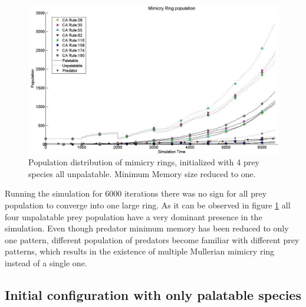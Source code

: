 \documentclass[letterpaper]{article}
\numberwithin{equation}{section}
\begin{document}
\begin{figure}[H]
	\centering
	\includegraphics[scale=0.45]{../tex/images/simTime6k-4Prey-unp-1-mem}
	\caption[Population distribution of mimicry rings(4 prey, all unpalatable but reduced predator memory)]{Population distribution of mimicry rings, initialized with 4 prey species all unpalatable. Minimum Memory size reduced to one.}
	\label{fig:plot-4-prey-unp-1-mem}
\end{figure}

Running the simulation for 6000 iterations there was no sign for all prey population to converge into one large ring. As it can be observed in figure \ref{fig:plot-4-prey-unp-1-mem} all four unpalatable prey population have a very dominant presence in the simulation. Even though predator minimum memory has been reduced to only one pattern, different population of predators become familiar with different prey patterns, which results in the existence of multiple Mullerian mimicry ring instead of a single one.

\subsection{Initial configuration with only palatable species}
\label{sec:init-only-palatable-species}
\end{document}
